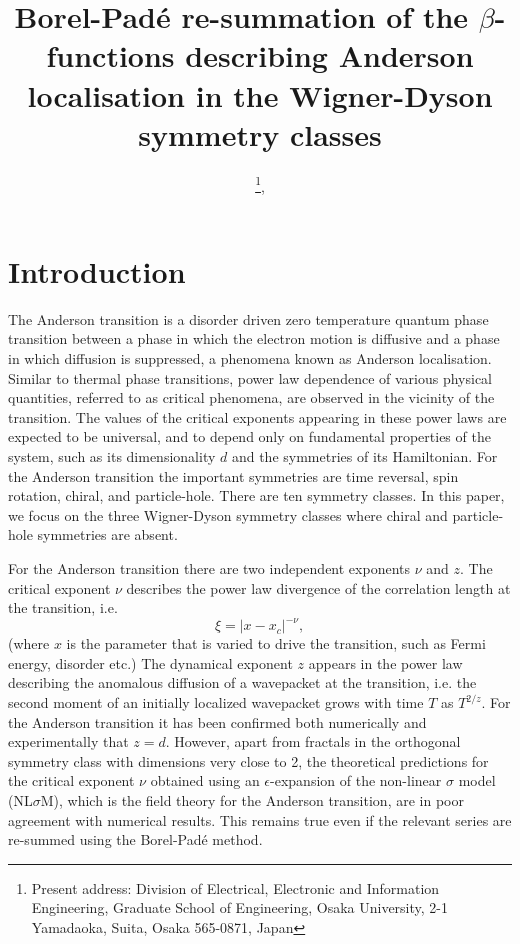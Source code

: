 \documentclass[singlecolumn]{jpsj3}
\title{Borel-Pad\'e re-summation of the $\beta$-functions describing Anderson localisation in the Wigner-Dyson symmetry classes}
\author{\name{Yoshiki \surname{Ueoka}}\thanks{Present address: Division of Electrical, Electronic and Information Engineering, Graduate School of Engineering, Osaka University, 2-1 Yamadaoka, Suita, Osaka 565-0871, Japan}, \name{Keith \surname{Slevin}}}
\begin{document}
\maketitle
\newpage
\section{Introduction}

The Anderson transition is a disorder driven zero temperature quantum phase transition between a phase in which the electron motion is diffusive and a phase in which diffusion is suppressed, a phenomena known as Anderson localisation.\cite{Anderson58, Lee85, Evers08}
Similar to thermal phase transitions\cite{Nishimori11}, power law dependence of various physical quantities, referred to as critical phenomena, are observed in the vicinity of the transition.
The values of the critical exponents appearing in these power laws are expected to be universal, and to depend only on fundamental properties of the system, such as its dimensionality $d$ and the symmetries of its Hamiltonian.
For the Anderson transition the important symmetries are time reversal, spin rotation, chiral, and particle-hole.
There are ten symmetry classes\cite{Evers08}.
In this paper, we focus on the three Wigner-Dyson symmetry classes where chiral and particle-hole symmetries are absent.

For the Anderson transition there are two independent exponents $\nu$ and $z$.
The critical exponent $\nu$ describes the power law divergence of the correlation length at the transition, i.e.
\begin{equation}
	\xi = \left| x - x _c\right|^{-\nu} ,
\end{equation}
(where $x$ is the parameter that is varied to drive the transition, such as Fermi energy, disorder etc.)
The dynamical exponent $z$ appears in the power law describing the anomalous diffusion of a wavepacket at the transition, i.e. the second moment of an initially localized wavepacket grows with time $T$ as $T^{2/z}$.
For the Anderson transition it has been confirmed both numerically\cite{Ohtsuki97} and experimentally\cite{Chabe08} that $z=d$.
However, apart from fractals in the orthogonal symmetry class with dimensions very close to 2, the theoretical predictions for the critical exponent $\nu$
obtained using an $\epsilon$-expansion of the non-linear $\sigma$ model (NL$\sigma$M)\cite{Wegner79,Schafer80,Jungling80,Efetov80},
which is the field theory for the Anderson transition,
are in poor agreement with numerical results. This remains true even if the relevant series are re-summed using the Borel-Pad\'{e} method.
\end{document}

